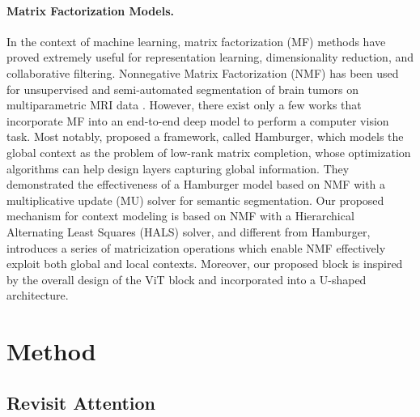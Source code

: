 \documentclass[a4,12pt]{article}
\begin{document}
	
	\paragraph{Matrix Factorization Models.} 
	In the context of machine learning, matrix factorization (MF) methods have proved extremely useful for representation learning, dimensionality reduction, and collaborative filtering. Nonnegative Matrix Factorization (NMF) has been used for unsupervised and semi-automated segmentation of brain tumors on multiparametric MRI data \citep{sauwen2016comparison, sauwen2017semi}. However, there exist only a few works that incorporate MF into an end-to-end deep model to perform a computer vision task. Most notably, \citet{geng2021attention} proposed a framework, called Hamburger, which models the global context as the problem of low-rank matrix completion, whose optimization algorithms can help design layers capturing global information. They demonstrated the effectiveness of a Hamburger model based on NMF with a multiplicative update (MU) solver for semantic segmentation. Our proposed mechanism for context modeling is based on NMF with a Hierarchical Alternating Least Squares (HALS) solver, and different from Hamburger, introduces a series of matricization operations which enable NMF effectively exploit both global and local contexts. Moreover, our proposed block is inspired by the overall design of the ViT block and incorporated into a U-shaped architecture. 
	
	
	\section{Method} \label{sec: method}
	
	
	\subsection{Revisit Attention} \label{sec: attention}
	
\end{document}
